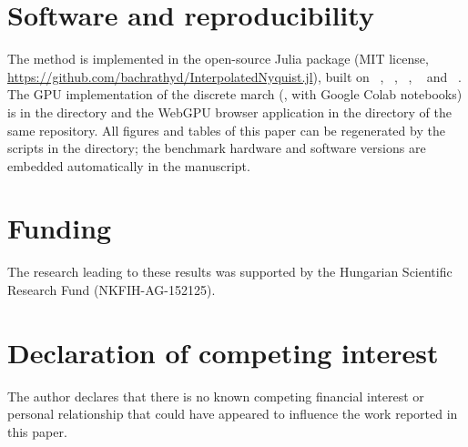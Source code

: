 \section*{Software and reproducibility}
The method is implemented in the open-source Julia package
 (MIT license,
\url{https://github.com/bachrathyd/InterpolatedNyquist.jl}), built on
~\cite{rackauckas2017differentialequations},
~\cite{revels2016forward},
~\cite{johnson2013quadgk},
~\cite{bachrathy2025mdbm} and
~\cite{vandenheuvel2024delaunay}. The GPU
implementation of the discrete march (, with Google Colab
notebooks) is in the  directory and the WebGPU browser application
in the  directory of the same repository. All figures and tables
of this paper can be regenerated by the scripts in the 
directory; the benchmark hardware and software versions are embedded
automatically in the manuscript.

\section*{Funding}
The research leading to these results was supported by the Hungarian
Scientific Research Fund (NKFIH-AG-152125).

\section*{Declaration of competing interest}
The author declares that there is no known competing financial interest or
personal relationship that could have appeared to influence the work
reported in this paper.
